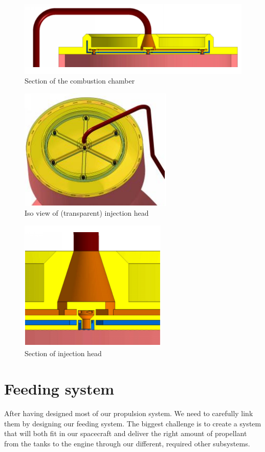 \begin{figure}[H]
	\centering\includegraphics[width=0.8\linewidth]{sectioncc}
	\caption{Section of the combustion chamber}
\end{figure}
\begin{figure}[H]
	\centering\includegraphics[width=0.5\linewidth]{isoview}
	\caption{Iso view of (transparent) injection head}
\end{figure}
\begin{figure}[H]
	\centering\includegraphics[width=0.5\linewidth]{headsection}
	\caption{Section of injection head}
\end{figure}
\section{Feeding system}
\label{sec:10-7}
After having designed most of our propulsion system. We need to carefully link them by designing our feeding system. The biggest challenge is to create a system that will both fit in our spacecraft and deliver the right amount of propellant from the tanks to the engine through our different, required other subsystems.\\

